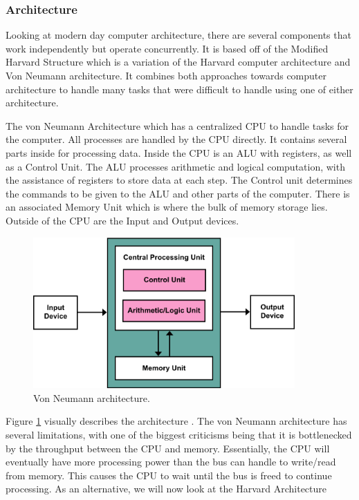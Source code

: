 \subsubsection{Architecture}\label{subsubsec:Arch}

Looking at modern day computer architecture, there are several components that work independently but operate concurrently.
It is based off of the Modified Harvard Structure which is a variation of the Harvard computer architecture and Von Neumann architecture.
It combines both approaches towards computer architecture to handle many tasks that were difficult to handle using one of either architecture.

The von Neumann Architecture which has a centralized CPU to handle tasks for the computer.
All processes are handled by the CPU directly.
It contains several parts inside for processing data.
Inside the CPU is an ALU with registers, as well as a Control Unit.
The ALU processes arithmetic and logical computation, with the assistance of registers to store data at each step.
The Control unit determines the commands to be given to the ALU and other parts of the computer.
There is an associated Memory Unit which is where the bulk of memory storage lies.
Outside of the CPU are the Input and Output devices.

\begin{figure}[htb]
    \centering
    \includegraphics[width=10cm]{Images/Von_Neumann_Architecture.png}
       \caption{Von Neumann architecture.}
           \label{fig:VonNeumannArch}
\end{figure}

Figure \ref{fig:VonNeumannArch} visually describes the architecture \cite{vonNeumannImg}.
The von Neumann architecture has several limitations, with one of the biggest criticisms being that it is bottlenecked by the throughput between the CPU and memory.
Essentially, the CPU will eventually have more processing power than the bus can handle to write/read from memory.
This causes the CPU to wait until the bus is freed to continue processing.
As an alternative, we will now look at the Harvard Architecture

